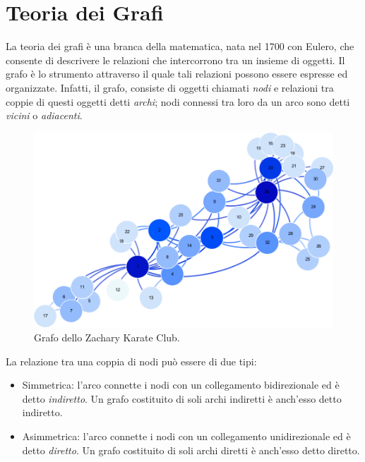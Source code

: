 \section{Teoria dei Grafi}
La teoria dei grafi è una branca della matematica, nata nel 1700 con Eulero, che consente di descrivere le relazioni che intercorrono tra un insieme di oggetti. Il grafo è lo strumento attraverso il quale tali relazioni possono essere espresse ed organizzate. Infatti, il grafo, consiste di oggetti chiamati \textit{nodi} e relazioni tra coppie di questi oggetti detti \textit{archi}; nodi connessi tra loro da un arco sono detti \textit{vicini} o \textit{adiacenti}.\\
\begin{figure}[h!]
	\centering
	\includegraphics[scale=.3]{img/zkc.png}
	\caption{Grafo dello Zachary Karate Club.}
\end{figure}
\newpage
La relazione tra una coppia di nodi può essere di due tipi:
\begin{itemize}
	\item Simmetrica: l'arco connette i nodi con un collegamento bidirezionale ed è detto \textit{indiretto}. Un grafo costituito di soli archi indiretti è anch'esso detto indiretto.
	\item Asimmetrica: l'arco connette i nodi con un collegamento unidirezionale ed è detto \textit{diretto}. Un grafo costituito di soli archi diretti è anch'esso detto diretto.
\end{itemize}
